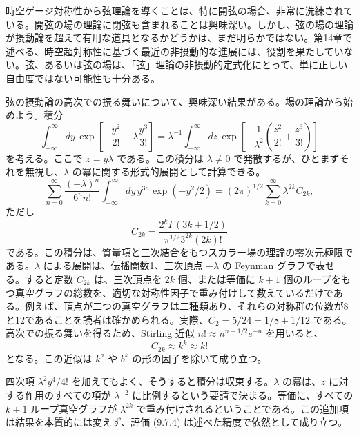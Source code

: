 時空ゲージ対称性から弦理論を導くことは、特に開弦の場合、非常に洗練されている。開弦の場の理論に閉弦も含まれることは興味深い。しかし、弦の場の理論が摂動論を超えて有用な道具となるかどうかは、まだ明らかではない。第14章で述べる、時空超対称性に基づく最近の非摂動的な進展には、役割を果たしていない。弦、あるいは弦の場は、「弦」理論の非摂動的定式化にとって、単に正しい自由度ではない可能性も十分ある。

\label{sec:9.7}

弦の摂動論の高次での振る舞いについて、興味深い結果がある。場の理論から始めよう。積分
\begin{equation}
\int_{-\infty}^{\infty}dy\,
\exp\left[-\frac{y^2}{2!}-\lambda\frac{y^3}{3!}\right]
=\lambda^{-1}\int_{-\infty}^{\infty}dz\,
\exp\left[-\frac1{\lambda^2}
\left(\frac{z^2}{2!}+\frac{z^3}{3!}\right)\right]
\tag{9.7.1}\label{eq:9.7.1}
\end{equation}
を考える。ここで $z=y\lambda$ である。この積分は $\lambda\ne0$ で発散するが、ひとまずそれを無視し、$\lambda$ の冪に関する形式的展開として計算できる。
\begin{equation}
\sum_{n=0}^{\infty}\frac{(-\lambda)^n}{6^nn!}
\int_{-\infty}^{\infty}dy\,y^{3n}\exp(-y^2/2)
=(2\pi)^{1/2}\sum_{k=0}^{\infty}\lambda^{2k}C_{2k},
\tag{9.7.2}\label{eq:9.7.2}
\end{equation}
ただし
\begin{equation}
C_{2k}=\frac{2^k\Gamma(3k+1/2)}{\pi^{1/2}3^{2k}(2k)!}
\tag{9.7.3}\label{eq:9.7.3}
\end{equation}
である。この積分は、質量項と三次結合をもつスカラー場の理論の零次元極限である。$\lambda$ による展開は、伝播関数1、三次頂点 $-\lambda$ の Feynman グラフで表せる。すると定数 $C_{2k}$ は、三次頂点を $2k$ 個、または等価に $k+1$ 個のループをもつ真空グラフの総数を、適切な対称性因子で重み付けして数えているだけである。例えば、頂点が二つの真空グラフは二種類あり、それらの対称群の位数が8と12であることを読者は確かめられる。実際、$C_2=5/24=1/8+1/12$ である。高次での振る舞いを得るため、Stirling 近似 $n!\approx n^{n+1/2}e^{-n}$ を用いると、
\begin{equation}
C_{2k}\approx k^k\approx k!
\tag{9.7.4}\label{eq:9.7.4}
\end{equation}
となる。この近似は $k^a$ や $b^k$ の形の因子を除いて成り立つ。

四次項 $\lambda^2y^4/4!$ を加えてもよく、そうすると積分は収束する。$\lambda$ の冪は、$z$ に対する作用のすべての項が $\lambda^{-2}$ に比例するという要請で決まる。等価に、すべての $k+1$ ループ真空グラフが $\lambda^{2k}$ で重み付けされるということである。この追加項は結果を本質的には変えず、評価 (9.7.4) は述べた精度で依然として成り立つ。

